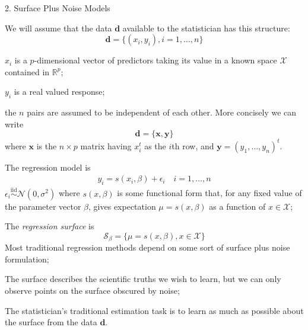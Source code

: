 \begin{frame}[fragile]

\bi
\item[2.] Surface Plus Noise Models
\ei

\end{frame}
\begin{frame}[fragile]

We will assume that the data $\mathbf{d}$ available to the statistician
has this structure:
$$\mathbf{d} = \{(x_i,y_i), i=1,\ldots,n\}$$
\bi
\item  $x_i$ is a $p$-dimensional vector of predictors taking its value
in a known space $\mathcal{X}$ contained in $\mathbb{R}^p$;
\item $y_i$ is a real valued response;
\item the $n$ pairs are assumed to be independent of each
other.
\ei
More concisely we can write
$$\mathbf{d} = \{\mathbf{x},\mathbf{y}\}$$
where $\mathbf{x}$ is the $n\times p$ matrix having $x_i^t$ as the $i$th row, and $\mathbf{y}=(y_1,\ldots,y_n)^t$.


\end{frame}
\begin{frame}[fragile]

\bi
\item The regression model is
\begin{eqnarray}
y_i = s(x_i,\beta) + \epsilon_i \quad i=1,\ldots,n
\end{eqnarray}
$\epsilon_i \stackrel{\mathrm{iid}}{\sim}\mathcal{N}(0,\sigma^2)$
where $s(x,\beta)$ is some functional form that, for any fixed
value of the parameter vector $\beta$, gives expectation $\mu=s(x,\beta)$ as a function of $x\in \mathcal{X}$; 

\item The \emph{regression surface} is
$$\mathcal{S}_\beta = \{\mu=s(x,\beta), x\in \mathcal{X}\}$$
Most traditional regression methods depend on some sort of
surface plus noise formulation;

\item The surface describes the scientific truths
we wish to learn, but we can only observe points on the surface
obscured by noise;

\item The statistician’s traditional estimation task is to learn as much as possible about the surface from the
data $\mathbf{d}$.
\ei

\end{frame}
